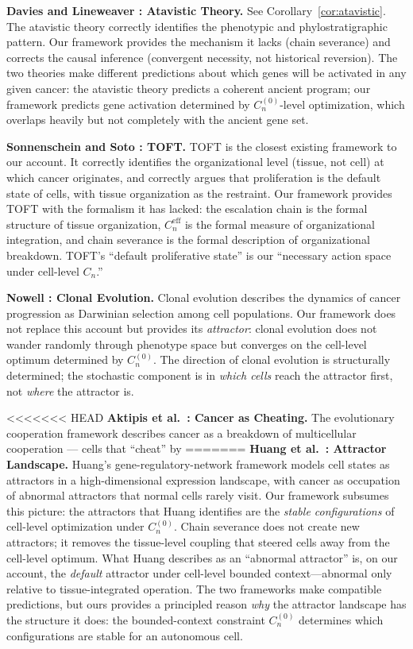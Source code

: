 \documentclass[11pt]{article}
\theoremstyle{definition}
\theoremstyle{remark}
\begin{document}
\textbf{Davies and Lineweaver \cite{Davies2011}: Atavistic Theory.}
See Corollary~\ref{cor:atavistic}. The atavistic theory correctly
identifies the phenotypic and phylostratigraphic pattern. Our
framework provides the mechanism it lacks (chain severance) and
corrects the causal inference (convergent necessity, not historical
reversion). The two theories make different predictions about which
genes will be activated in any given cancer: the atavistic theory
predicts a coherent ancient program; our framework predicts
gene activation determined by $C_n^{(0)}$-level optimization,
which overlaps heavily but not completely with the ancient gene set.

\textbf{Sonnenschein and Soto \cite{Sonnenschein2000}: TOFT.}
TOFT is the closest existing framework to our account. It correctly
identifies the organizational level (tissue, not cell) at which
cancer originates, and correctly argues that proliferation is the
default state of cells, with tissue organization as the restraint.
Our framework provides TOFT with the formalism it has lacked: the
escalation chain is the formal structure of tissue organization,
$C_n^{\mathrm{eff}}$ is the formal measure of organizational
integration, and chain severance is the formal description of
organizational breakdown. TOFT's ``default proliferative state'' is
our ``necessary action space under cell-level $C_n$.''

\textbf{Nowell \cite{Nowell1976}: Clonal Evolution.}
Clonal evolution describes the dynamics of cancer progression as
Darwinian selection among cell populations. Our framework does not
replace this account but provides its \emph{attractor}: clonal
evolution does not wander randomly through phenotype space but
converges on the cell-level optimum determined by $C_n^{(0)}$. The
direction of clonal evolution is structurally determined; the
stochastic component is in \emph{which cells} reach the attractor
first, not \emph{where} the attractor is.

<<<<<<< HEAD
\textbf{Aktipis et al.\ \cite{Aktipis2015}: Cancer as Cheating.}
The evolutionary cooperation framework describes cancer as a
breakdown of multicellular cooperation --- cells that ``cheat'' by
=======
\textbf{Huang et al.\ \cite{Huang2009}: Attractor Landscape.}
Huang's gene-regulatory-network framework models cell states as
attractors in a high-dimensional expression landscape, with cancer
as occupation of abnormal attractors that normal cells rarely visit.
Our framework subsumes this picture: the attractors that Huang
identifies are the \emph{stable configurations} of cell-level
optimization under $C_n^{(0)}$. Chain severance does not create new
attractors; it removes the tissue-level coupling that steered cells
away from the cell-level optimum. What Huang describes as an
``abnormal attractor'' is, on our account, the \emph{default}
attractor under cell-level bounded context---abnormal only relative
to tissue-integrated operation. The two frameworks make compatible
predictions, but ours provides a principled reason \emph{why} the
attractor landscape has the structure it does: the bounded-context
constraint $C_n^{(0)}$ determines which configurations are stable
for an autonomous cell.
\end{document}
